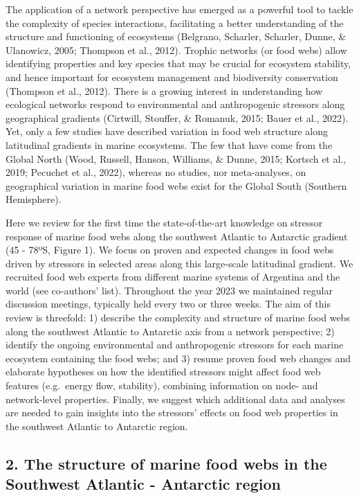 \documentclass[
]{article}
\begin{document}
The application of a network perspective has emerged as a powerful tool
to tackle the complexity of species interactions, facilitating a better
understanding of the structure and functioning of ecosystems (Belgrano,
Scharler, Scharler, Dunne, \& Ulanowicz, 2005; Thompson et al., 2012).
Trophic networks (or food webs) allow identifying properties and key
species that may be crucial for ecosystem stability, and hence important
for ecosystem management and biodiversity conservation (Thompson et al.,
2012). There is a growing interest in understanding how ecological
networks respond to environmental and anthropogenic stressors along
geographical gradients (Cirtwill, Stouffer, \& Romanuk, 2015; Bauer et
al., 2022). Yet, only a few studies have described variation in food web
structure along latitudinal gradients in marine ecosystems. The few that
have come from the Global North (Wood, Russell, Hanson, Williams, \&
Dunne, 2015; Kortsch et al., 2019; Pecuchet et al., 2022), whereas no
studies, nor meta-analyses, on geographical variation in marine food
webs exist for the Global South (Southern Hemisphere).

Here we review for the first time the state-of-the-art knowledge on
stressor response of marine food webs along the southwest Atlantic to
Antarctic gradient (45 - 78ºS, Figure 1). We focus on proven and
expected changes in food webs driven by stressors in selected areas
along this large-scale latitudinal gradient. We recruited food web
experts from different marine systems of Argentina and the world (see
co-authors' list). Throughout the year 2023 we maintained regular
discussion meetings, typically held every two or three weeks. The aim of
this review is threefold: 1) describe the complexity and structure of
marine food webs along the southwest Atlantic to Antarctic axis from a
network perspective; 2) identify the ongoing environmental and
anthropogenic stressors for each marine ecosystem containing the food
webs; and 3) resume proven food web changes and elaborate hypotheses on
how the identified stressors might affect food web features (e.g.~energy
flow, stability), combining information on node- and network-level
properties. Finally, we suggest which additional data and analyses are
needed to gain insights into the stressors' effects on food web
properties in the southwest Atlantic to Antarctic region.

\subsection{2. The structure of marine food webs in the Southwest
Atlantic - Antarctic
region}\label{the-structure-of-marine-food-webs-in-the-southwest-atlantic---antarctic-region}
\end{document}
